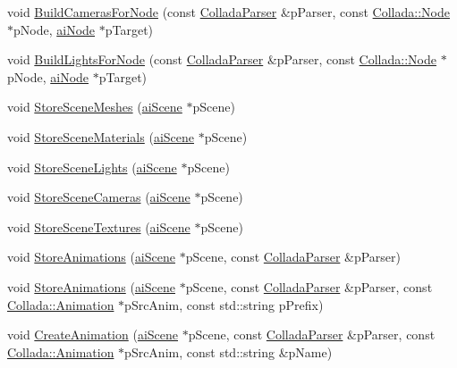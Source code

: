 \begin{DoxyCompactItemize}
\item 
void \hyperlink{class_assimp_1_1_collada_loader_a224a5dbbf4a9e12e14756a93c619bbc5}{Build\+Cameras\+For\+Node} (const \hyperlink{class_assimp_1_1_collada_parser}{Collada\+Parser} \&p\+Parser, const \hyperlink{struct_assimp_1_1_collada_1_1_node}{Collada\+::\+Node} $\ast$p\+Node, \hyperlink{structai_node}{ai\+Node} $\ast$p\+Target)
\item 
void \hyperlink{class_assimp_1_1_collada_loader_a6bd9ac82aec97771274553772e12a27a}{Build\+Lights\+For\+Node} (const \hyperlink{class_assimp_1_1_collada_parser}{Collada\+Parser} \&p\+Parser, const \hyperlink{struct_assimp_1_1_collada_1_1_node}{Collada\+::\+Node} $\ast$p\+Node, \hyperlink{structai_node}{ai\+Node} $\ast$p\+Target)
\item 
void \hyperlink{class_assimp_1_1_collada_loader_addbee11ead49ff6d535fdb600326e541}{Store\+Scene\+Meshes} (\hyperlink{structai_scene}{ai\+Scene} $\ast$p\+Scene)
\item 
void \hyperlink{class_assimp_1_1_collada_loader_a893aff018a239fc0ef12eabc66834823}{Store\+Scene\+Materials} (\hyperlink{structai_scene}{ai\+Scene} $\ast$p\+Scene)
\item 
void \hyperlink{class_assimp_1_1_collada_loader_ae1bbdaa375f5329fceb665e5ceb32304}{Store\+Scene\+Lights} (\hyperlink{structai_scene}{ai\+Scene} $\ast$p\+Scene)
\item 
void \hyperlink{class_assimp_1_1_collada_loader_aa876a9ce8f3cd17b6d688ed39cf920d0}{Store\+Scene\+Cameras} (\hyperlink{structai_scene}{ai\+Scene} $\ast$p\+Scene)
\item 
void \hyperlink{class_assimp_1_1_collada_loader_a80fe92456e3bd411b10ce29b5fa71628}{Store\+Scene\+Textures} (\hyperlink{structai_scene}{ai\+Scene} $\ast$p\+Scene)
\item 
void \hyperlink{class_assimp_1_1_collada_loader_ab2f9fe3ebdb1921b827cbf28994add20}{Store\+Animations} (\hyperlink{structai_scene}{ai\+Scene} $\ast$p\+Scene, const \hyperlink{class_assimp_1_1_collada_parser}{Collada\+Parser} \&p\+Parser)
\item 
void \hyperlink{class_assimp_1_1_collada_loader_a526310565202bcfd69a0157f0b4063c9}{Store\+Animations} (\hyperlink{structai_scene}{ai\+Scene} $\ast$p\+Scene, const \hyperlink{class_assimp_1_1_collada_parser}{Collada\+Parser} \&p\+Parser, const \hyperlink{struct_assimp_1_1_collada_1_1_animation}{Collada\+::\+Animation} $\ast$p\+Src\+Anim, const std\+::string p\+Prefix)
\item 
void \hyperlink{class_assimp_1_1_collada_loader_a155bbcc17bbded120a60c48786ca8004}{Create\+Animation} (\hyperlink{structai_scene}{ai\+Scene} $\ast$p\+Scene, const \hyperlink{class_assimp_1_1_collada_parser}{Collada\+Parser} \&p\+Parser, const \hyperlink{struct_assimp_1_1_collada_1_1_animation}{Collada\+::\+Animation} $\ast$p\+Src\+Anim, const std\+::string \&p\+Name)

\end{DoxyCompactItemize}
